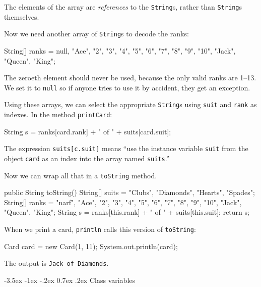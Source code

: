 \documentclass[12pt]{book}
\makeatletter
\theoremstyle{exercise}
\newcommand{\java}[1]{\verb"#1"}
\renewcommand{\section}{\@startsection{section}{1}{\z@}%
    {-3.5ex \@plus -1ex \@minus -.2ex}%
    {0.7ex \@plus.2ex}%
    {\normalfont\Large\bfseries}}
\newcommand{\java}[1]{\lstinline{#1}} %
\makeatother
\begin{document}

The elements of the array are {\em references} to the \java{String}s, rather than \java{String}s themselves.

Now we need another array of \java{String}s to decode the ranks:

\begin{code}
    String[] ranks = {null, "Ace", "2", "3", "4", "5", "6",
               "7", "8", "9", "10", "Jack", "Queen", "King"};
\end{code}

The zeroeth element should never be used, because the only valid ranks are 1--13.
We set it to \java{null} so if anyone tries to use it by accident, they get an exception.

Using these arrays, we can select the appropriate \java{String}s using \java{suit} and \java{rank} as indexes.
In the method \java{printCard}:

\begin{code}
String s = ranks[card.rank] + " of " + suits[card.suit];
\end{code}

The expression \java{suits[c.suit]} means ``use the instance variable \java{suit} from the object \java{card} as an index into the array named \java{suits}.''

Now we can wrap all that in a \java{toString} method.

\begin{code}
public String toString() {
    String[] suits = {"Clubs", "Diamonds", "Hearts", "Spades"};
    String[] ranks = {"narf", "Ace", "2", "3", "4", "5", "6",
               "7", "8", "9", "10", "Jack", "Queen", "King"};
    String s = ranks[this.rank] + " of " + suits[this.suit];
    return s;
}
\end{code}

When we print a card, \java{println} calls this version of \java{toString}:

\begin{code}
    Card card = new Card(1, 11);
    System.out.println(card);
\end{code}

The output is {\tt Jack of Diamonds}.


\section{Class variables}
\label{classvar}
\end{document}

